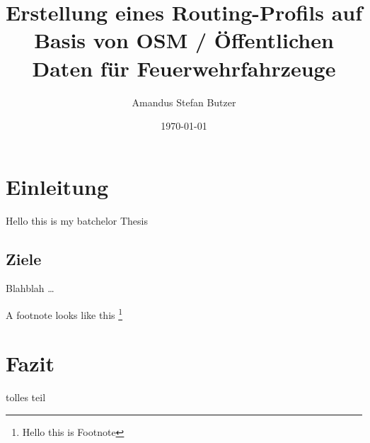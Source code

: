 \documentclass[10pt,a4paper]{article}
\author{Amandus Stefan Butzer}
\title{Erstellung eines Routing-Profils auf Basis von OSM / Öffentlichen Daten für Feuerwehrfahrzeuge}
\date{\today}
\begin{document}
\maketitle


\section{Einleitung}

Hello this is my batchelor Thesis

\subsection{Ziele}

Blahblah \ldots


A footnote looks like this \footnote{Hello this is Footnote}

\section{Fazit}

tolles teil
\end{document}
